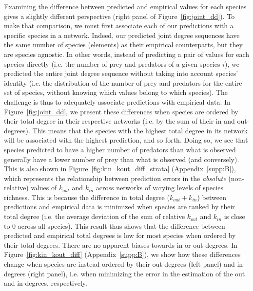 \clearpage

Examining the difference between predicted and empirical values for each species
gives a slightly different perspective (right panel of Figure~\ref{fig:joint_dd}).
To make that comparison, we must first associate each of our predictions with a
specific species in a network. Indeed, our predicted joint degree sequences have
the same number of species (elements) as their empirical counterparts, but they
are species agnostic. In other words, instead of predicting a pair of values for
each species directly (i.e. the number of prey and predators of a given species
$i$), we predicted the entire joint degree sequence without taking into account
species' identity (i.e. the distribution of the number of prey and predators for
the entire set of species, without knowing which values belong to which
species). The challenge is thus to adequately associate predictions with
empirical data. In Figure~\ref{fig:joint_dd}, we present these differences when
species are ordered by their total degree in their respective networks (i.e. by
the sum of their in and out-degrees). This means that the species with the
highest total degree in its network will be associated with the highest
prediction, and so forth. Doing so, we see that species predicted to have a
higher number of predators than what is observed generally have a lower number
of prey than what is observed (and conversely). This is also shown in
Figure~\ref{fig:kin_kout_diff_strata} (Appendix~\ref{supp:B}), which represents the
relationship between prediction errors in the \textit{absolute} (non-relative)
values of $k_{out}$ and $k_{in}$ across networks of varying levels of species
richness. This is because the difference in total degree ($k_{out} + k_{in}$)
between predictions and empirical data is minimized when species are ranked by
their total degree (i.e. the average deviation of the sum of relative $k_{out}$
and $k_{in}$ is close to $0$ across all species). This result thus shows that
the difference between predicted and empirical total degrees is low for most
species when ordered by their total degrees. There are no apparent biases
towards in or out degrees. In Figure~\ref{fig:kin_kout_diff}
(Appendix~\ref{supp:B}), we show how these differences change when species are
instead ordered by their out-degrees (left panel) and in-degrees (right panel),
i.e. when minimizing the error in the estimation of the out and in-degrees,
respectively.

